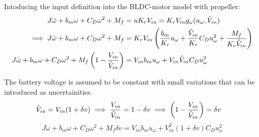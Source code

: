 Intoducing the input definition into the BLDC-motor model with propeller:
\begin{align*}
    J\dot \omega + b_m \omega + C_D \omega^2 + M_f &= u K_r V_{in} = K_r V_{in} g_\omega(u_\omega, \hat V_{in})\\
    \implies  J \dot \omega + b_m \omega + C_D \omega^2 + M_f &= K_r V_{in} \left( \frac{b_m}{K_r} u_\omega + \frac{\hat V_{in}}{K_r} C_D u_\omega^2 + \frac{M_f}{K_r  \hat V_{in}} \right)\\
    J \dot \omega + b_m \omega + C_D \omega^2 + M_f \left( 1 - \frac{V_{in}}{\hat V_{in}} \right) &= V_{in} b_m u_\omega + V_{in} \hat V_{in} C_D u_\omega^2
\end{align*}

 The battery voltage is assumed to be constant with small variations that can be introduced as uncertainities.
\begin{align*}
    \hat V_{in} &= V_{in} ( 1 + \delta v)
    \implies \frac{V_{in}}{\hat V_{in}} = 1 - \delta v
    \implies \left( 1 - \frac{V_{in}}{\hat V_{in}} \right) = \delta v
\end{align*}
\begin{equation}\label{eqn::nl_model}
    J \dot \omega + b_m \omega + C_D \omega^2 + M_f \delta v = V_{in} b_m u_\omega + V_{in}^2 (1 + \delta v) C_D u_\omega^2
\end{equation}

